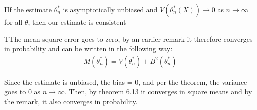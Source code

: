 \par\bigskip
\begin{theo}
  IIf the estimate $\theta_n^*$ is asymptotically unbiased and $V(\theta_n^*(X))\to0$ as $n\to\infty$ for all $\theta$, then our estimate is consistent
\end{theo}
\par\bigskip
\begin{prf}
  TThe mean square error goes to zero, by an earlier remark it therefore converges in probability and can be written in the following way:
  \begin{equation*}
    \begin{gathered}
      M(\theta_n^*) = V(\theta_n^*)+B^2(\theta_n^*)
    \end{gathered}
  \end{equation*}\par
 \noindent Since the estimate is unbiased, the bias = 0, and per the theorem, the variance goes to 0 as $n\to\infty$. Then, by theorem 6.13 it converges in square means and by the remark, it also converges in probability. 
\end{prf}

